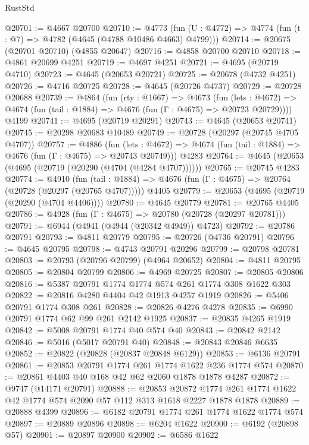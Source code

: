 \begin{lexlean}{RustStd}
\begin{coremodule}
@20701 := @4667 @20700
@20710 := @4773
    (fun (U : @4772) => @4774 (fun (t : @7) => @4782 (@4645 (@4788 @10486 @4663) @4799)))
@20714 := @20675 (@20701 @20710) (@4855 @20647)
@20716 := @4858 @20700 @20710
@20718 := @4861 @20699 @4251
@20719 := @4697 @4251
@20721 := @4695 (@20719 @4710)
@20723 := @4645 (@20653 @20721)
@20725 := @20678 (@4732 @4251)
@20726 := @4716 @20725
@20728 := @4645 (@20726 @4737)
@20729 := @20728 @20688
@20739 := @4864
    (fun (rty : @1667) =>
    @4673
      (fun (lets : @4672) =>
      @4674 (fun (tail : @1884) => @4676 (fun (Γ : @4675) => @20723 @20729))))
    @4199
@20741 := @4695 (@20719 @20291)
@20743 := @4645 (@20653 @20741)
@20745 := @20298 @20683 @10489
@20749 := @20728 (@20297 (@20745 @4705 @4707))
@20757 := @4886
    (fun (lets : @4672) => @4674 (fun (tail : @1884) => @4676 (fun (Γ : @4675) => @20743 @20749)))
    @4283
@20764 := @4645 (@20653 (@4695 (@20719 (@20290 (@4704 (@4284 @4707))))))
@20765 := @20745 @4283
@20774 := @4910
    (fun (tail : @1884) => @4676 (fun (Γ : @4675) => @20764 (@20728 (@20297 (@20765 @4707)))))
    @4405
@20779 := @20653 (@4695 (@20719 (@20290 (@4704 @4406))))
@20780 := @4645 @20779
@20781 := @20765 @4405
@20786 := @4928 (fun (Γ : @4675) => @20780 (@20728 (@20297 @20781)))
@20791 := @6944 (@4941 (@4944 (@20342 @4949)) @4723)
@20792 := @20786 @20791
@20793 := @4811 @20779
@20795 := @20726 (@4736 @20791)
@20796 := @4645 @20795
@20798 := @4743 @20791 @20296
@20799 := @20798 @20781
@20803 := @20793 (@20796 @20799) (@4964 @20652)
@20804 := @4811 @20795
@20805 := @20804 @20799
@20806 := @4969 @20725
@20807 := @20805 @20806
@20816 := @5387 @20791 @1774 @1774 @574 @261 @1774 @308 @1622 @303
@20822 := @20816 @4280 @4404 @42 @1913 @4257 @1919
@20826 := @5406 @20791 @1774 @308 @261
@20828 := @20826 @4276 @4278
@20835 := @6990 @20791 @1774 @62 @99 @261 @2142 @1925
@20837 := @20835 @4265 @1919
@20842 := @5008 @20791 @1774 @40 @574 @40
@20843 := @20842 @2142
@20846 := @5016 (@5017 @20791 @40)
@20848 := @20843 @20846 @6635
@20852 := @20822 (@20828 (@20837 @20848 @6129))
@20853 := @6136 @20791
@20861 := @20853 @20791 @1774 @261 @1774 @1622 @236 @1774 @574
@20870 := @20861 @4403 @40 @168 @42 @62 @2060 @1878 @1878 @4287
@20872 := @9747 (@14171 @20791)
@20888 := @20853
    @20872
    @1774
    @261
    @1774
    @1622
    @42
    @1774
    @574
    @2090
    @57
    @112
    @313
    @1618
    @2227
    @1878
    @1878
@20889 := @20888 @4399
@20896 := @6182 @20791 @1774 @261 @1774 @1622 @1774 @574
@20897 := @20889 @20896
@20898 := @6204 @1622
@20900 := @6192 (@20898 @57)
@20901 := @20897 @20900
@20902 := @6586 @1622

\end{coremodule}
\end{lexlean}
